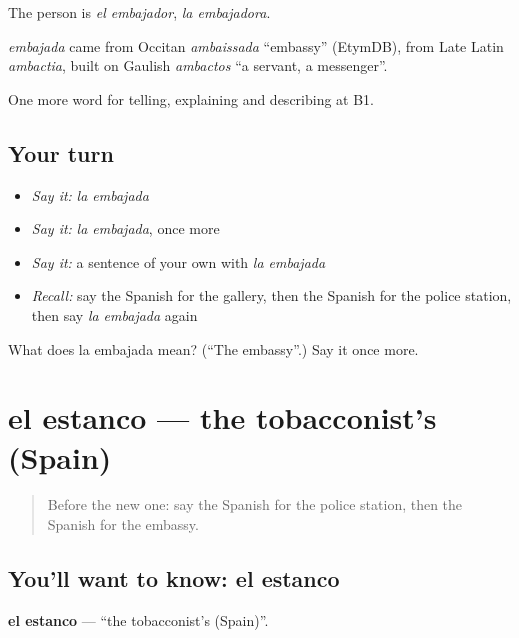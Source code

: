 The person is \emph{el embajador}, \emph{la embajadora}.

\begin{cousinweb}
\emph{embajada} came from Occitan \emph{ambaissada} \textquotedblleft{}embassy\textquotedblright{} (EtymDB), from Late Latin \emph{ambactia}, built on Gaulish \emph{ambactos} \textquotedblleft{}a servant, a messenger\textquotedblright{}.
\end{cousinweb}

\begin{grammarlens}[title={What you've built}]
One more word for telling, explaining and describing at B1.
\end{grammarlens}

\subsection*{Your turn}
\begin{itemize}
\raggedright
  \item \emph{Say it:} \emph{la embajada}
  \item \emph{Say it:} \emph{la embajada}, once more
  \item \emph{Say it:} a sentence of your own with \emph{la embajada}
  \item \emph{Recall:} say the Spanish for the gallery, then the Spanish for the police station, then say \emph{la embajada} again
\end{itemize}

\begin{tcolorbox}[breakable,colback=teal!4,colframe=teal!35!black,title={Before you move on}]
What does la embajada mean? (\textquotedblleft{}The embassy\textquotedblright{}.) Say it once more.
\end{tcolorbox}
\section[el estanco]{el estanco — the tobacconist’s (Spain)}

\label{lesson:ES-C679-estanco}



\begin{quote}
Before the new one: say the Spanish for the police station, then the Spanish for the embassy.
\end{quote}

\subsection*{You'll want to know: el estanco}
\textbf{el estanco} — \textquotedblleft{}the tobacconist’s (Spain)\textquotedblright{}.

